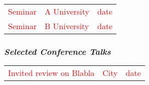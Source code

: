 \documentclass[STG]{ercgrant}
\begin{document}
\begin{longtable}{p{7.5cm}p{6cm}l}
	\textcolor{red}{Seminar} & \textcolor{red}{A University} & \textcolor{red}{date} \\
	\textcolor{red}{Seminar} & \textcolor{red}{B University} & \textcolor{red}{date} \\
\end{longtable}

\subsubsection*{\textit{Selected Conference Talks}}

\begin{longtable}{p{7.5cm}p{6cm}l}
	\textcolor{red}{Invited review on Blabla} & \textcolor{red}{City} & \textcolor{red}{date} \\
\end{longtable}
\end{document}
